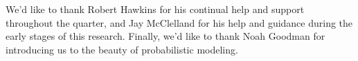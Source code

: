 \documentclass[10pt,letterpaper]{article}
\begin{document}
	We'd like to thank Robert Hawkins for his continual help and support throughout the quarter, and Jay McClelland for his help and guidance during the early stages of this research. Finally, we'd like to thank Noah Goodman for introducing us to the beauty of probabilistic modeling.
	
	
	
	
	
	
	\setlength{\bibleftmargin}{.125in}
	\setlength{\bibindent}{-\bibleftmargin}
	
	
	
	
\end{document}
